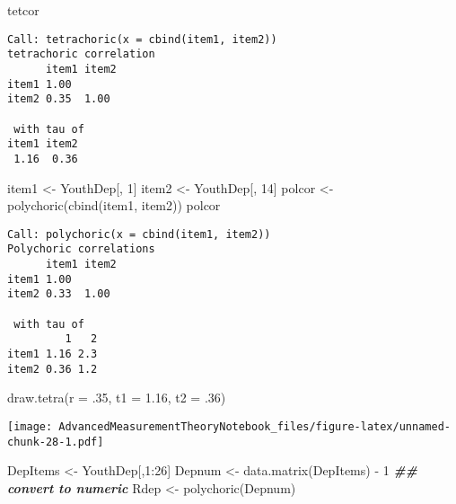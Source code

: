 \documentclass[
]{book}
\newenvironment{Shaded}{\begin{snugshade}}{\end{snugshade}}
\newcommand{\AttributeTok}[1]{\textcolor[rgb]{0.77,0.63,0.00}{#1}}
\newcommand{\DecValTok}[1]{\textcolor[rgb]{0.00,0.00,0.81}{#1}}
\newcommand{\DocumentationTok}[1]{\textcolor[rgb]{0.56,0.35,0.01}{\textbf{\textit{#1}}}}
\newcommand{\FloatTok}[1]{\textcolor[rgb]{0.00,0.00,0.81}{#1}}
\newcommand{\FunctionTok}[1]{\textcolor[rgb]{0.00,0.00,0.00}{#1}}
\newcommand{\NormalTok}[1]{#1}
\newcommand{\OtherTok}[1]{\textcolor[rgb]{0.56,0.35,0.01}{#1}}
\newcommand{\SpecialCharTok}[1]{\textcolor[rgb]{0.00,0.00,0.00}{#1}}
\begin{document}
\begin{Shaded}
\begin{Highlighting}[]
\NormalTok{tetcor}
\end{Highlighting}
\end{Shaded}

\begin{verbatim}
Call: tetrachoric(x = cbind(item1, item2))
tetrachoric correlation 
      item1 item2
item1 1.00       
item2 0.35  1.00 

 with tau of 
item1 item2 
 1.16  0.36 
\end{verbatim}

\begin{Shaded}
\begin{Highlighting}[]
\NormalTok{item1 }\OtherTok{\textless{}{-}}\NormalTok{ YouthDep[, }\DecValTok{1}\NormalTok{]}
\NormalTok{item2 }\OtherTok{\textless{}{-}}\NormalTok{ YouthDep[, }\DecValTok{14}\NormalTok{]}
\NormalTok{polcor }\OtherTok{\textless{}{-}} \FunctionTok{polychoric}\NormalTok{(}\FunctionTok{cbind}\NormalTok{(item1, item2))}
\NormalTok{polcor}
\end{Highlighting}
\end{Shaded}

\begin{verbatim}
Call: polychoric(x = cbind(item1, item2))
Polychoric correlations 
      item1 item2
item1 1.00       
item2 0.33  1.00 

 with tau of 
         1   2
item1 1.16 2.3
item2 0.36 1.2
\end{verbatim}

\begin{Shaded}
\begin{Highlighting}[]
\FunctionTok{draw.tetra}\NormalTok{(}\AttributeTok{r =}\NormalTok{ .}\DecValTok{35}\NormalTok{, }\AttributeTok{t1 =} \FloatTok{1.16}\NormalTok{, }\AttributeTok{t2 =}\NormalTok{ .}\DecValTok{36}\NormalTok{)}
\end{Highlighting}
\end{Shaded}

\texttt{[image: AdvancedMeasurementTheoryNotebook\_files/figure-latex/unnamed-chunk-28-1.pdf]}

\begin{Shaded}
\begin{Highlighting}[]
\NormalTok{DepItems }\OtherTok{\textless{}{-}}\NormalTok{ YouthDep[,}\DecValTok{1}\SpecialCharTok{:}\DecValTok{26}\NormalTok{] }
\NormalTok{Depnum }\OtherTok{\textless{}{-}} \FunctionTok{data.matrix}\NormalTok{(DepItems) }\SpecialCharTok{{-}} \DecValTok{1}  \DocumentationTok{\#\# convert to numeric   }
\NormalTok{Rdep }\OtherTok{\textless{}{-}} \FunctionTok{polychoric}\NormalTok{(Depnum)}
\end{Highlighting}
\end{Shaded}
\end{document}
